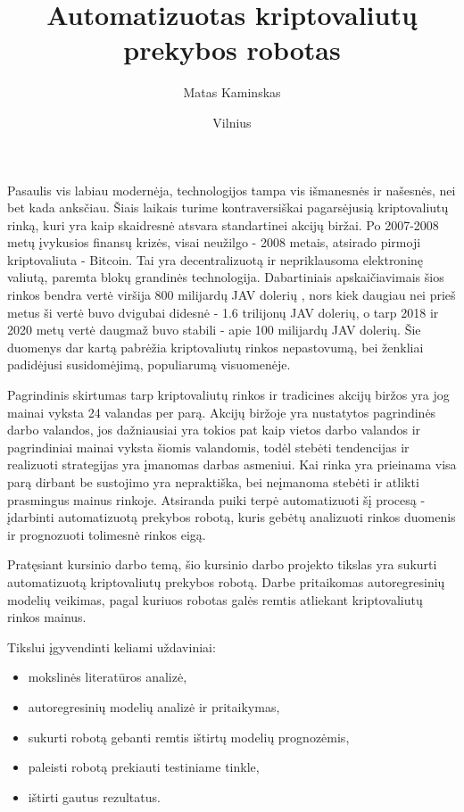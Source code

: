 \documentclass{VUMIFInfKursinis}
\institute{Informatikos institutas}  %
\title{Automatizuotas kriptovaliutų prekybos robotas}
\author{Matas Kaminskas}
\date{Vilnius \\ \the\year}
\begin{document}
\maketitle

\tableofcontents

Pasaulis vis labiau modernėja, technologijos tampa vis išmanesnės ir našesnės, nei bet kada anksčiau. Šiais laikais turime kontraversiškai pagarsėjusią
kriptovaliutų rinką, kuri yra kaip skaidresnė atsvara standartinei akcijų biržai. Po 2007-2008 metų įvykusios finansų krizės,
visai neužilgo - \cite{nakamoto2008bitcoin} 2008 metais, atsirado pirmoji kriptovaliuta - Bitcoin. Tai yra decentralizuotą ir nepriklausoma elektroninę valiutą, paremta
blokų grandinės technologija. Dabartiniais apskaičiavimais šios rinkos bendra vertė viršija 800 milijardų JAV dolerių \cite{CoinMarketCap},
nors kiek daugiau nei prieš metus ši vertė buvo dvigubai didesnė - 1.6 trilijonų JAV dolerių, o tarp 2018 ir 2020 metų vertė daugmaž buvo stabili - apie 100 milijardų JAV dolerių.
Šie duomenys dar kartą pabrėžia kriptovaliutų rinkos nepastovumą, bei ženkliai padidėjusi susidomėjimą, populiarumą visuomenėje.    


Pagrindinis skirtumas tarp kriptovaliutų rinkos ir tradicines akcijų biržos yra jog mainai vyksta 24 valandas per parą. Akcijų biržoje yra nustatytos pagrindinės darbo valandos,
jos dažniausiai yra tokios pat kaip vietos darbo valandos ir pagrindiniai mainai vyksta šiomis valandomis, todėl stebėti tendencijas ir realizuoti strategijas yra įmanomas darbas asmeniui.
Kai rinka yra prieinama visa parą dirbant be sustojimo yra nepraktiška, bei neįmanoma stebėti ir atlikti prasmingus mainus rinkoje. Atsiranda puiki terpė automatizuoti šį 
procesą - įdarbinti automatizuotą prekybos robotą, kuris gebėtų analizuoti rinkos duomenis ir prognozuoti tolimesnė rinkos eigą.


Pratęsiant kursinio darbo temą, šio kursinio darbo projekto tikslas yra sukurti automatizuotą kriptovaliutų prekybos robotą. 
Darbe pritaikomas autoregresinių modelių veikimas, pagal kuriuos robotas galės remtis atliekant kriptovaliutų rinkos mainus. 

Tikslui įgyvendinti keliami uždaviniai:
\begin{itemize}
  \item mokslinės literatūros analizė,
  \item autoregresinių modelių analizė ir pritaikymas,
  \item sukurti robotą gebanti remtis ištirtų modelių prognozėmis,
  \item paleisti robotą prekiauti testiniame tinkle,
  \item ištirti gautus rezultatus.
\end{itemize}
\end{document}
